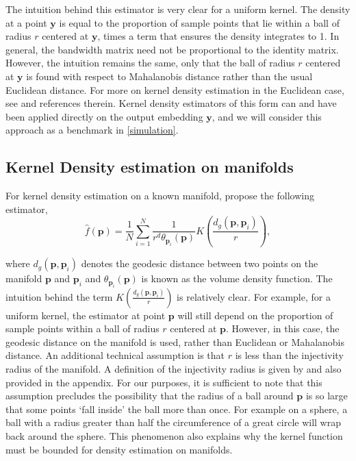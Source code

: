\documentclass[11pt,a4paper,]{article}
\begin{document}
The intuition behind this estimator is very clear for a uniform kernel. The density at a point \(\pmb{y}\) is equal to the proportion of sample points that lie within a ball of radius \(r\) centered at \(\pmb{y}\), times a term that ensures the density integrates to 1. In general, the bandwidth matrix need not be proportional to the identity matrix. However, the intuition remains the same, only that the ball of radius \(r\) centered at \(\pmb{y}\) is found with respect to Mahalanobis distance rather than the usual Euclidean distance. For more on kernel density estimation in the Euclidean case, see \textcite{Scott2015-vl} and references therein. Kernel density estimators of this form can and have been applied directly on the output embedding \(\pmb{y}\), and we will consider this approach as a benchmark in \autoref{simulation}.

\hypertarget{Pellet}{%
\subsection{Kernel Density estimation on manifolds}\label{Pellet}}

For kernel density estimation on a known manifold, \textcite{Pelletier2005-vu} propose the following estimator,
\begin{equation}
\label{eq:denriem}
\hat{f}(\pmb{p}) = \frac{1}{N} \sum_{i=1}^{N} \frac{1}{r^d \theta_{\pmb{p}_i}(\pmb{p})} K\left(\frac{d_g(\pmb{p}, \pmb{p}_i)}{r}\right),
\end{equation}

where \(d_g(\pmb{p}, \pmb{p}_i)\) denotes the geodesic distance between two points on the manifold \(\pmb{p}\) and \(\pmb{p}_i\) and \(\theta_{\pmb{p}_i}(\pmb{p})\) is known as the volume density function. The intuition behind the term \(K\left(\frac{d_g(\pmb{p}, \pmb{p}_i)}{r}\right)\) is relatively clear. For example, for a uniform kernel, the estimator at point \(\pmb{p}\) will still depend on the proportion of sample points within a ball of radius \(r\) centered at \(\pmb{p}\). However, in this case, the geodesic distance on the manifold is used, rather than Euclidean or Mahalanobis distance. An additional technical assumption is that \(r\) is less than the injectivity radius of the manifold. A definition of the injectivity radius is given by \textcite{Chavel2006-mp} and also provided in the appendix. For our purposes, it is sufficient to note that this assumption precludes the possibility that the radius of a ball around \(\pmb{p}\) is so large that some points `fall inside' the ball more than once. For example on a sphere, a ball with a radius greater than half the circumference of a great circle will wrap back around the sphere. This phenomenon also explains why the kernel function must be bounded for density estimation on manifolds.
\end{document}
